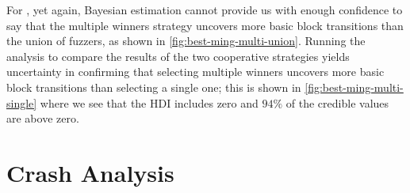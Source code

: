 For \listswf, yet again, Bayesian estimation cannot provide us with enough
confidence to say that the multiple winners strategy uncovers more basic block
transitions than the union of fuzzers, as shown in
\autoref{fig:best-ming-multi-union}. Running the analysis to compare the results
of the two cooperative strategies yields uncertainty in confirming that
selecting multiple winners uncovers more basic block transitions than selecting
a single one; this is shown in \autoref{fig:best-ming-multi-single} where we see
that the \ac{HDI} includes zero and $94\%$ of the credible values are above
zero.

\section{Crash Analysis}

